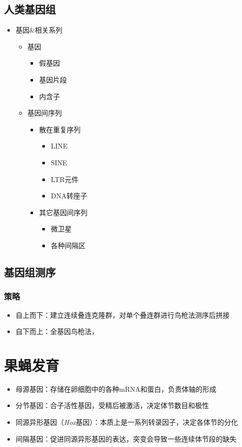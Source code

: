\documentclass[a4paper, 12pt]{report}
\begin{document}
\section{人类基因组}
\begin{itemize}
    \item 基因\&相关系列
          \begin{itemize}
              \item 基因
                    \begin{itemize}
                        \item 假基因
                        \item 基因片段
                        \item 内含子
                    \end{itemize}
              \item 基因间序列
                    \begin{itemize}
                        \item 散在重复序列
                              \begin{itemize}
                                  \item LINE
                                  \item SINE
                                  \item LTR元件
                                  \item DNA转座子
                              \end{itemize}
                        \item 其它基因间序列
                              \begin{itemize}
                                  \item 微卫星
                                  \item 各种间隔区
                              \end{itemize}
                    \end{itemize}
          \end{itemize}
\end{itemize}
\section{基因组测序}
\subsection{策略}
\begin{itemize}
    \item 自上而下：建立连续叠连克隆群，对单个叠连群进行鸟枪法测序后拼接
    \item 自下而上：全基因鸟枪法，
\end{itemize}


\chapter{
  果蝇发育
 }
\begin{itemize}
    \item 母源基因：存储在卵细胞中的各种mRNA和蛋白，负责体轴的形成
    \item 分节基因：合子活性基因，受精后被激活，决定体节数目和极性
    \item 同源异形基因（\textit{Hox}基因）：本质上是一系列转录因子，决定各体节的分化
    \item 间隔基因：促进同源异形基因的表达，突变会导致一些连续体节段的缺失
\end{itemize}
\end{document}
